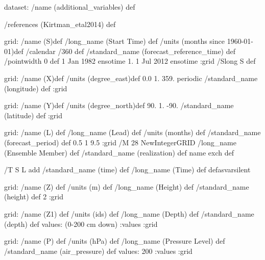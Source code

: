 \begin{ingrid}

 dataset:
 /name (additional_variables) def

/references (Kirtman_etal2014) def

grid:
/name (S)def
/long_name (Start Time) def
/units (months since 1960-01-01)def
/calendar /360 def
/standard_name (forecast_reference_time) def
/pointwidth 0 def
1 Jan 1982 ensotime
 1. 
1 Jul 2012 ensotime
:grid
/Slong S def

grid:
/name (X)def
/units (degree_east)def
 0.0 1. 359.
 periodic
/standard_name (longitude) def
:grid

grid:
/name (Y)def
/units (degree_north)def
 90. 1. -90.
/standard_name (latitude) def
:grid

grid:
/name (L) def
/long_name (Lead) def
/units (months) def
/standard_name (forecast_period) def
0.5 1 9.5
:grid
/M 28 NewIntegerGRID
/long_name (Ensemble Member) def
/standard_name (realization) def
 name exch def

/T { S L add
/standard_name (time) def /long_name (Time) def } defasvarsilent

grid:
/name (Z) def
/units (m) def
/long_name (Height) def
/standard_name (height) def
2 :grid

grid:
/name (Z1) def
/units (ids) def
/long_name (Depth) def
/standard_name (depth) def
values: (0-200 cm down) :values
:grid

grid:
/name (P) def
/units (hPa) def
/long_name (Pressure Level) def
/standard_name (air_pressure) def
values: 200 :values
:grid

\end{ingrid}

